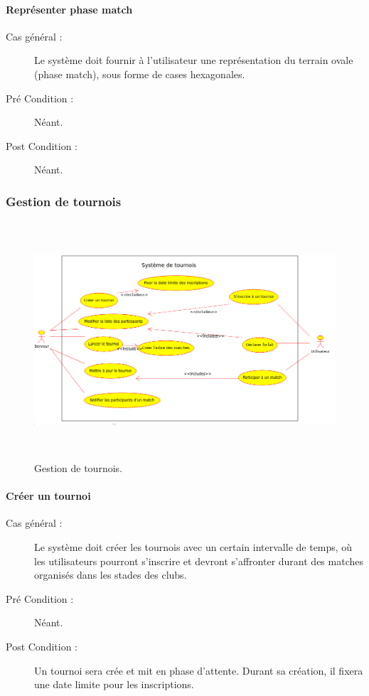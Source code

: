 \documentclass[a4paper]{article}
\begin{document}
\paragraph{Représenter phase match}
\begin{description}
\item[Cas général :] Le système doit fournir à l'\gls{utilisateur} une représentation du terrain ovale (phase match), sous forme de cases hexagonales.
\item[Pré Condition  :] Néant.
\item[Post Condition :] Néant.
\end{description}

\subsubsection{Gestion de tournois}
\begin{figure}[h]
   \caption{\label{1} Gestion de tournois.}
   \begin{center}
   \includegraphics[height=250pt]{uml/servTournoi.png}
   \end{center}
\end{figure}
\paragraph{Créer un tournoi}
\begin{description}
\item[Cas général :] Le système doit créer les tournois avec un certain intervalle de temps, où les \glspl{utilisateur} pourront s'inscrire et devront s'affronter durant des matches organisés dans les stades des \glspl{club}.
\item[Pré Condition  :] Néant.
\item[Post Condition :] Un tournoi sera crée et mit en phase d'attente.
Durant sa création, il fixera une date limite pour les inscriptions.
\end{description}
\end{document}
